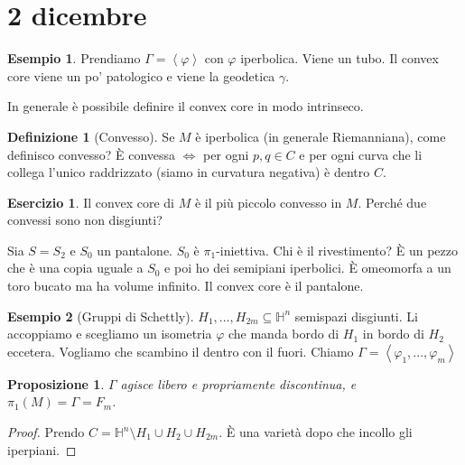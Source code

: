 \documentclass[a4paper]{article}
\newtheorem{proposition}{Proposizione}
\theoremstyle{definition}
\newtheorem{definition}{Definizione}
\newtheorem{exercise}{Esercizio}
\newtheorem{example}{Esempio}
\begin{document}
\section{2 dicembre}
    
    \begin{example}
        Prendiamo $\Gamma = \left<\varphi\right>$ con $\varphi$ iperbolica. Viene un tubo. Il convex core viene un po' patologico e viene la geodetica $\gamma$.
    \end{example}
    
    In generale è possibile definire il convex core in modo intrinseco.

    \begin{definition}[Convesso]
        Se $M$ è iperbolica (in generale Riemanniana), come definisco convesso? È convessa $\iff$ per ogni $p,q \in C$ e per ogni curva che li collega l'unico raddrizzato (siamo in curvatura negativa) è dentro $C$.
    \end{definition}

    \begin{exercise}
        Il convex core di $M$ è il più piccolo convesso in $M$. Perché due convessi sono non disgiunti?
    \end{exercise}

    Sia $S = S_2$ e $S_0$ un pantalone. $S_0$ è $\pi_1$-iniettiva. Chi è il rivestimento? È un pezzo che è una copia uguale a $S_0$ e poi ho dei semipiani iperbolici. È omeomorfa a un toro bucato ma ha volume infinito. Il convex core è il pantalone.

    \begin{example}[Gruppi di Schettly]
        $H_1, \ldots, H_{2 m} \subseteq \mathbb H^n$ semispazi disgiunti. Li accoppiamo e scegliamo un isometria $\varphi$ che manda bordo di $H_{1}$ in bordo di $H_{2}$ eccetera. Vogliamo che scambino il dentro con il fuori. Chiamo $\Gamma = \left<\varphi_1, ..., \varphi_m\right>$
    \end{example}

    \begin{proposition}
        $\Gamma$ agisce libero e propriamente discontinua, e $\pi_{1} (M) = \Gamma = F_{m}$.
    \end{proposition}

    \begin{proof}
        Prendo $C = \mathbb H^n \setminus H_1 \cup H_2 \cup H_{2 m}$. È una varietà dopo che incollo gli iperpiani.
    \end{proof}
\end{document}
